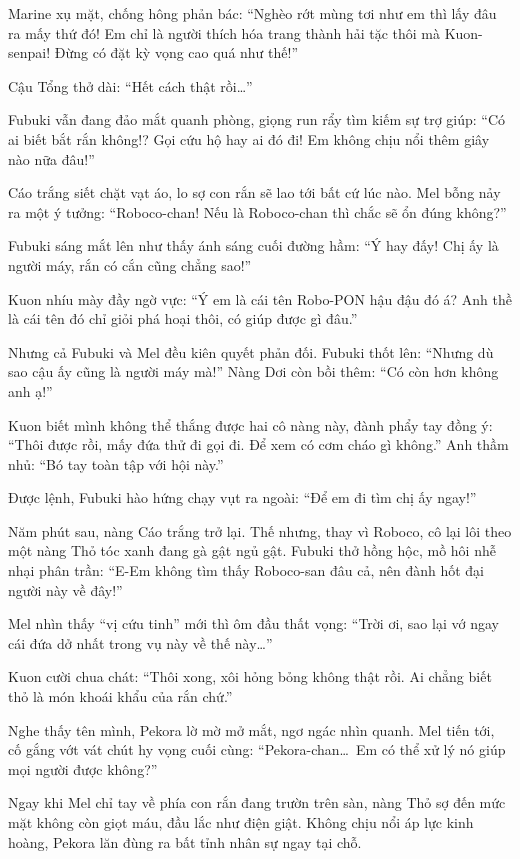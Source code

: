\documentclass[../main.tex]{subfiles}
\begin{document}
Marine xụ mặt, chống hông phản bác: ``Nghèo rớt mùng tơi như em thì lấy đâu ra mấy thứ đó! Em chỉ là người thích hóa trang thành hải tặc thôi mà Kuon-senpai! Đừng có đặt kỳ vọng cao quá như thế!''

Cậu Tổng thở dài: ``Hết cách thật rồi\dots''

Fubuki vẫn đang đảo mắt quanh phòng, giọng run rẩy tìm kiếm sự trợ giúp: ``Có ai biết bắt rắn không!? Gọi cứu hộ hay ai đó đi! Em không chịu nổi thêm giây nào nữa đâu!''

Cáo trắng siết chặt vạt áo, lo sợ con rắn sẽ lao tới bất cứ lúc nào. Mel bỗng nảy ra một ý tưởng: ``Roboco-chan! Nếu là Roboco-chan thì chắc sẽ ổn đúng không?''

Fubuki sáng mắt lên như thấy ánh sáng cuối đường hầm: ``Ý hay đấy! Chị ấy là người máy, rắn có cắn cũng chẳng sao!''

Kuon nhíu mày đầy ngờ vực: ``Ý em là cái tên Robo-PON hậu đậu đó á? Anh thề là cái tên đó chỉ giỏi phá hoại thôi, có giúp được gì đâu.''

Nhưng cả Fubuki và Mel đều kiên quyết phản đối. Fubuki thốt lên: ``Nhưng dù sao cậu ấy cũng là người máy mà!'' Nàng Dơi còn bồi thêm: ``Có còn hơn không anh ạ!''

Kuon biết mình không thể thắng được hai cô nàng này, đành phẩy tay đồng ý: ``Thôi được rồi, mấy đứa thử đi gọi đi. Để xem có cơm cháo gì không.'' Anh thầm nhủ: ``Bó tay toàn tập với hội này.''

Được lệnh, Fubuki hào hứng chạy vụt ra ngoài: ``Để em đi tìm chị ấy ngay!''

\ct

Năm phút sau, nàng Cáo trắng trở lại. Thế nhưng, thay vì Roboco, cô lại lôi theo một nàng Thỏ tóc xanh đang gà gật ngủ gật. Fubuki thở hồng hộc, mồ hôi nhễ nhại phân trần: ``E-Em không tìm thấy Roboco-san đâu cả, nên đành hốt đại người này về đây!''


Mel nhìn thấy ``vị cứu tinh'' mới thì ôm đầu thất vọng: ``Trời ơi, sao lại vớ ngay cái đứa dở nhất trong vụ này về thế này\dots''

Kuon cười chua chát: ``Thôi xong, xôi hỏng bỏng không thật rồi. Ai chẳng biết thỏ là món khoái khẩu của rắn chứ.''

Nghe thấy tên mình, Pekora lờ mờ mở mắt, ngơ ngác nhìn quanh. Mel tiến tới, cố gắng vớt vát chút hy vọng cuối cùng: ``Pekora-chan\dots\ Em có thể xử lý nó giúp mọi người được không?''

Ngay khi Mel chỉ tay về phía con rắn đang trườn trên sàn, nàng Thỏ sợ đến mức mặt không còn giọt máu, đầu lắc như điện giật. Không chịu nổi áp lực kinh hoàng, Pekora lăn đùng ra bất tỉnh nhân sự ngay tại chỗ.
\end{document}
